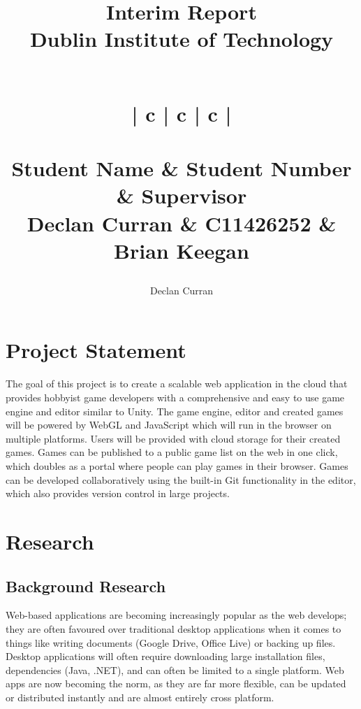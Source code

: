 \documentclass[a4paper, 12pt]{article}
\begin{document}
\title{
	{Interim Report}\\
	\large{Dublin Institute of Technology}\\
	~\\
	\begin{tabular}{| c | c | c |}
		\hline
		 \\
		\\ \hline
		\textbf{Student Name} & \textbf{Student Number} & \textbf{Supervisor} \\
		Declan Curran & C11426252 & Brian Keegan \\ \hline
	\end{tabular}
}
\author{Declan Curran}
\maketitle
\newpage

\setcounter{tocdepth}{3}
\tableofcontents
\listoffigures
\listoftables
\newpage

\section{Project Statement}
The goal of this project is to create a scalable web application in the cloud that provides hobbyist game developers with a comprehensive and easy to use game engine and editor similar to Unity. The game engine, editor and created games will be powered by WebGL and JavaScript which will run in the browser on multiple platforms. Users will be provided with cloud storage for their created games. Games can be published to a public game list on the web in one click, which doubles as a portal where people can play games in their browser. Games can be developed collaboratively using the built-in Git functionality in the editor, which also provides version control in large projects.

\section{Research}
\subsection{Background Research}

Web-based applications are becoming increasingly popular as the web develops; they are often favoured over traditional desktop applications when it comes to things like writing documents (Google Drive, Office Live) or backing up files.\cite{6068340} Desktop applications will often require downloading large installation files, dependencies (Java, .NET), and can often be limited to a single platform. Web apps are now becoming the norm, as they are far more flexible, can be updated or distributed instantly and are almost entirely cross platform.\cite{5936687}
\end{document}
